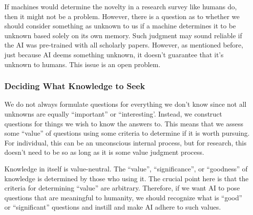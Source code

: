 
If machines would determine the novelty in a research survey like humans do, then it might not be a problem. However, there is a question as to whether we should consider something as unknown to us if a machine determines it to be unknown based solely on its own memory. Such judgment may sound reliable if the AI was pre-trained with all scholarly papers. However, as mentioned before, just because AI deems something unknown, it doesn't guarantee that it's unknown to humans. This issue is an open problem.


\subsubsection{Deciding What Knowledge to Seek}
We do not always formulate questions for everything we don't know since not all unknowns are equally ``important'' or ``interesting'. Instead, we construct questions for things we wish to know the answers to. This means that we assess some ``value'' of questions using some criteria to determine if it is worth pursuing. For individual, this can be an unconscious internal process, but for research, this doesn't need to be so as long as it is some value judgment process.

Knowledge in itself is value-neutral. The ``value'', ``significance'', or ``goodness'' of knowledge is determined by those who using it. The crucial point here is that the criteria for determining ``value'' are arbitrary. Therefore, if we want AI to pose questions that are meaningful to humanity, we should recognize what is ``good'' or ``significant'' questions and instill and make AI adhere to such values. 

